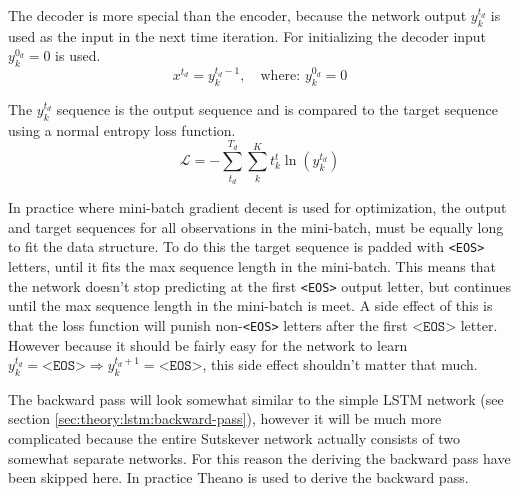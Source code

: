 The decoder is more special than the encoder, because the network output $y_k^{t_d}$ is used as the input in the next time iteration. For initializing the decoder input $y_k^{0_d} = 0$ is used.
\begin{equation}
x^{t_d} = y_k^{t_d - 1}, \quad \text{where: } y_k^{0_d} = 0
\end{equation}

The $y_k^{t_d}$ sequence is the output sequence and is compared to the target sequence using a normal entropy loss function.
\begin{equation}
\mathcal{L} = - \sum_{t_d}^{T_d} \sum_{k}^K t_k^t \ln(y_k^{t_d})
\end{equation}

In practice where mini-batch gradient decent is used for optimization, the output and target sequences for all observations in the mini-batch, must be equally long to fit the data structure. To do this the target sequence is padded with \texttt{<EOS>} letters, until it fits the max sequence length in the mini-batch. This means that the network doesn't stop predicting at the first \texttt{<EOS>} output letter, but continues until the max sequence  length in the mini-batch is meet. A side effect of this is that the loss function will punish non-\texttt{<EOS>} letters after the first $\texttt{<EOS>}$ letter. However because it should be fairly easy for the network to learn $y_k^{t_d} = \texttt{<EOS>} \Rightarrow y_k^{t_d+1} = \texttt{<EOS>}$, this side effect shouldn't matter that much.

The backward pass will look somewhat similar to the simple LSTM network (see section \ref{sec:theory:lstm:backward-pass}), however it will be much more complicated because the entire Sutskever network actually consists of two somewhat separate networks. For this reason the deriving the backward pass have been skipped here. In practice Theano \cite{theano-a, theano-b} is used to derive the backward pass.
